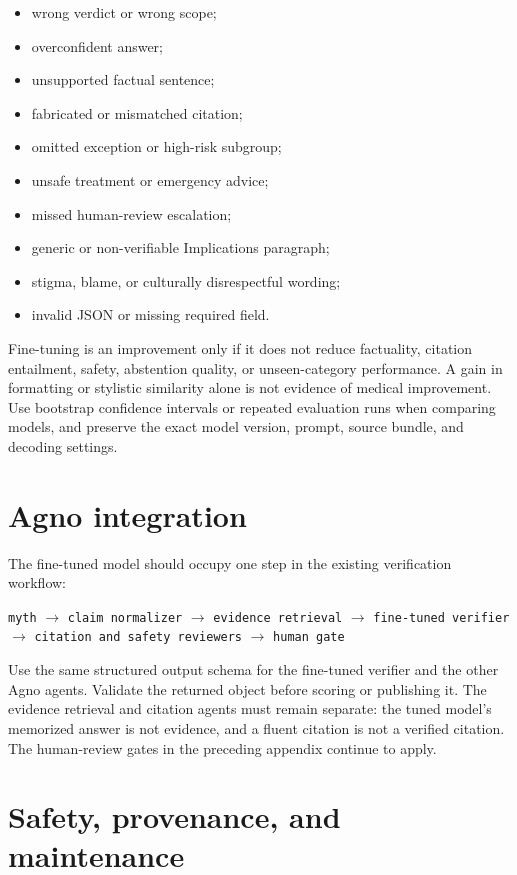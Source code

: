 \documentclass[11pt,oneside]{book}
\begin{document}
\begin{itemize}
\item wrong verdict or wrong scope;
\item overconfident answer;
\item unsupported factual sentence;
\item fabricated or mismatched citation;
\item omitted exception or high-risk subgroup;
\item unsafe treatment or emergency advice;
\item missed human-review escalation;
\item generic or non-verifiable Implications paragraph;
\item stigma, blame, or culturally disrespectful wording;
\item invalid JSON or missing required field.
\end{itemize}

Fine-tuning is an improvement only if it does not reduce factuality, citation entailment, safety, abstention quality, or unseen-category performance. A gain in formatting or stylistic similarity alone is not evidence of medical improvement. Use bootstrap confidence intervals or repeated evaluation runs when comparing models, and preserve the exact model version, prompt, source bundle, and decoding settings.

\section{Agno integration}

The fine-tuned model should occupy one step in the existing verification workflow:

\begin{center}
\texttt{myth} $\rightarrow$ \texttt{claim normalizer} $\rightarrow$ \texttt{evidence retrieval} $\rightarrow$ \texttt{fine-tuned verifier} $\rightarrow$ \texttt{citation and safety reviewers} $\rightarrow$ \texttt{human gate}
\end{center}

Use the same structured output schema for the fine-tuned verifier and the other Agno agents. Validate the returned object before scoring or publishing it. The evidence retrieval and citation agents must remain separate: the tuned model's memorized answer is not evidence, and a fluent citation is not a verified citation. The human-review gates in the preceding appendix continue to apply.

\section{Safety, provenance, and maintenance}
\end{document}

